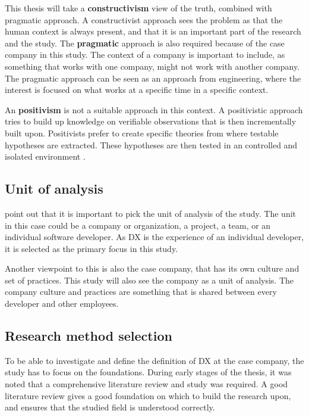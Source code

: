 \documentclass[english, 12pt, a4paper, sci, utf8, a-1b, online]{aaltothesis}
\begin{document}
This thesis will take a \textbf{constructivism} view of the truth, combined with pragmatic approach. A constructivist approach sees the problem as that the human context is always present, and that it is an important part of the research and the study. The \textbf{pragmatic} approach is also required because of the case company in this study. The context of a company is important to include, as something that works with one company, might not work with another company. The pragmatic approach can be seen as an approach from engineering, where the interest is focused on what works at a specific time in a specific context.

An \textbf{positivism} is not a suitable approach in this context. A positivistic approach tries to build up knowledge on verifiable observations that is then incrementally built upon. Positivists prefer to create specific theories from where testable hypotheses are extracted. These hypotheses are then tested in an controlled and isolated environment \citep{easterbrook2008selecting}.

\subsection{Unit of analysis}

\cite{easterbrook2008selecting} point out that it is important to pick the unit of analysis of the study. The unit in this case could be a company or organization, a project, a team, or an individual software developer. As DX is the experience of an individual developer, it is selected as the primary focus in this study.

Another viewpoint to this is also the case company, that has its own culture and set of practices. This study will also see the company as a unit of analysis. The company culture and practices are something that is shared between every developer and other employees.

\subsection{Research method selection}

To be able to investigate and define the definition of DX at the case company, the study has to focus on the foundations. During early stages of the thesis, it was noted that a comprehensive literature review and study was required. A good literature review gives a good foundation on which to build the research upon, and ensures that the studied field is understood correctly.
\end{document}
